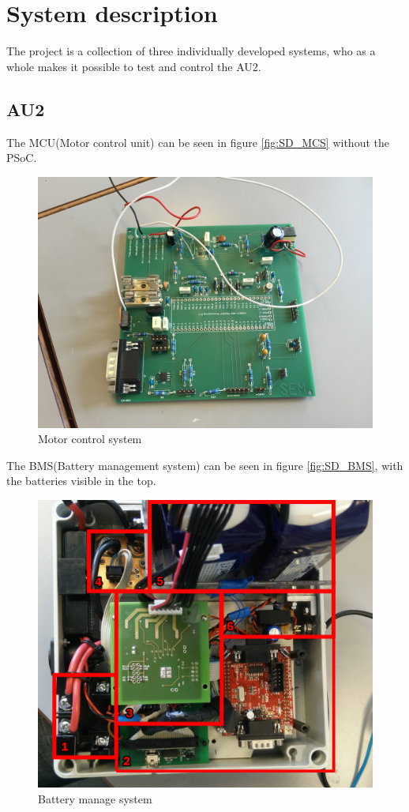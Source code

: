 \chapter{System description}
The project is a collection of three individually developed systems, who as a whole makes it possible to test and control the AU2.

\section{AU2}
The MCU(Motor control unit) can be seen in figure \vref{fig:SD_MCS} without the PSoC.

\begin{figure}[H]
	\centering
	\includegraphics[width=0.6\linewidth]{SubPages/Images/SD_MCS}
	\caption{Motor control system}
	\label{fig:SD_MCS}
\end{figure}

The BMS(Battery management system) can be seen in figure \vref{fig:SD_BMS}, with the batteries visible in the top.

\begin{figure}[H]
	\centering
	\includegraphics[width=0.7\linewidth]{SubPages/Images/SD_BMS}
	\caption{Battery manage system}
	\label{fig:SD_BMS}
\end{figure}

